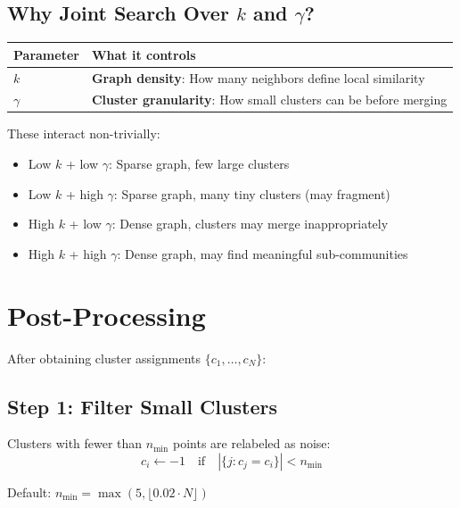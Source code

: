 \documentclass[11pt,a4paper]{article}
\begin{document}
\subsection{Why Joint Search Over $k$ and $\gamma$?}

\begin{table}[h]
\centering
\begin{tabular}{@{}ll@{}}
\toprule
\textbf{Parameter} & \textbf{What it controls} \\
\midrule
$k$ & \textbf{Graph density}: How many neighbors define local similarity \\
$\gamma$ & \textbf{Cluster granularity}: How small clusters can be before merging \\
\bottomrule
\end{tabular}
\end{table}

These interact non-trivially:
\begin{itemize}
    \item Low $k$ + low $\gamma$: Sparse graph, few large clusters
    \item Low $k$ + high $\gamma$: Sparse graph, many tiny clusters (may fragment)
    \item High $k$ + low $\gamma$: Dense graph, clusters may merge inappropriately
    \item High $k$ + high $\gamma$: Dense graph, may find meaningful sub-communities
\end{itemize}

\section{Post-Processing}

After obtaining cluster assignments $\{c_1, \ldots, c_N\}$:

\subsection{Step 1: Filter Small Clusters}

Clusters with fewer than $n_{\min}$ points are relabeled as noise:
\begin{equation}
    c_i \leftarrow -1 \quad \text{if} \quad |\{j : c_j = c_i\}| < n_{\min}
\end{equation}

Default: $n_{\min} = \max(5, \lfloor 0.02 \cdot N \rfloor)$
\end{document}
